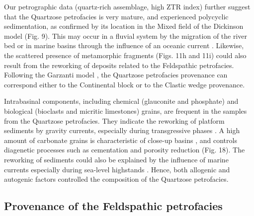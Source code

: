\documentclass[twoside]{article}
\begin{document}
Our petrographic data (quartz-rich assemblage, high ZTR index) further suggest that the Quartzose petrofacies is very mature, and experienced polycyclic sedimentation, as confirmed by its location in the Mixed field of the Dickinson model (Fig. 9). This may occur in a fluvial system by the migration of the river bed \citep{Amorosi2011} or in marine basins through the influence of an oceanic current \citep{Morton1999}. Likewise, the scattered presence of metamorphic fragments (Figs. 11h and 11i) could also result from the reworking of deposits related to the Feldspathic petrofacies. Following the Garzanti model \citep{Garzanti2007b}, the Quartzose petrofacies provenance can correspond either to the Continental block or to the Clastic wedge provenance.\par
Intrabasinal components, including chemical (glauconite and phosphate) and biological (bioclasts and micritic limestones) grains, are frequent in the samples from the Quartzose petrofacies. They indicate the reworking of platform sediments by gravity currents, especially during transgressive phases \citep{Odin1981,Garzanti1991}. A high amount of carbonate grains is characteristic of close-up basins \citep{Critelli2007}, and controls diagenetic processes such as cementation and porosity reduction (Fig. 18). The reworking of sediments could also be explained by the influence of marine currents \citep{Ingersoll1990,Ingersoll1993} especially during sea-level highstands \citep{Amorosi2011}. Hence, both allogenic and autogenic factors controlled the composition of the Quartzose petrofacies.


\subsection{Provenance of the Feldspathic petrofacies}
\end{document}
